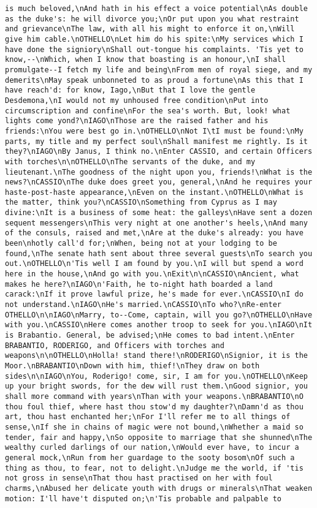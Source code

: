 \begin{verbatim}
is much beloved,\nAnd hath in his effect a voice potential\nAs double as the duke's: he will divorce you;\nOr put upon you what restraint and grievance\nThe law, with all his might to enforce it on,\nWill give him cable.\nOTHELLO\nLet him do his spite:\nMy services which I have done the signiory\nShall out-tongue his complaints. 'Tis yet to know,--\nWhich, when I know that boasting is an honour,\nI shall promulgate--I fetch my life and being\nFrom men of royal siege, and my demerits\nMay speak unbonneted to as proud a fortune\nAs this that I have reach'd: for know, Iago,\nBut that I love the gentle Desdemona,\nI would not my unhoused free condition\nPut into circumscription and confine\nFor the sea's worth. But, look! what lights come yond?\nIAGO\nThose are the raised father and his friends:\nYou were best go in.\nOTHELLO\nNot I\tI must be found:\nMy parts, my title and my perfect soul\nShall manifest me rightly. Is it they?\nIAGO\nBy Janus, I think no.\nEnter CASSIO, and certain Officers with torches\n\nOTHELLO\nThe servants of the duke, and my lieutenant.\nThe goodness of the night upon you, friends!\nWhat is the news?\nCASSIO\nThe duke does greet you, general,\nAnd he requires your haste-post-haste appearance,\nEven on the instant.\nOTHELLO\nWhat is the matter, think you?\nCASSIO\nSomething from Cyprus as I may divine:\nIt is a business of some heat: the galleys\nHave sent a dozen sequent messengers\nThis very night at one another's heels,\nAnd many of the consuls, raised and met,\nAre at the duke's already: you have been\nhotly call'd for;\nWhen, being not at your lodging to be found,\nThe senate hath sent about three several guests\nTo search you out.\nOTHELLO\n'Tis well I am found by you.\nI will but spend a word here in the house,\nAnd go with you.\nExit\n\nCASSIO\nAncient, what makes he here?\nIAGO\n'Faith, he to-night hath boarded a land carack:\nIf it prove lawful prize, he's made for ever.\nCASSIO\nI do not understand.\nIAGO\nHe's married.\nCASSIO\nTo who?\nRe-enter OTHELLO\n\nIAGO\nMarry, to--Come, captain, will you go?\nOTHELLO\nHave with you.\nCASSIO\nHere comes another troop to seek for you.\nIAGO\nIt is Brabantio. General, be advised;\nHe comes to bad intent.\nEnter BRABANTIO, RODERIGO, and Officers with torches and weapons\n\nOTHELLO\nHolla! stand there!\nRODERIGO\nSignior, it is the Moor.\nBRABANTIO\nDown with him, thief!\nThey draw on both sides\n\nIAGO\nYou, Roderigo! come, sir, I am for you.\nOTHELLO\nKeep up your bright swords, for the dew will rust them.\nGood signior, you shall more command with years\nThan with your weapons.\nBRABANTIO\nO thou foul thief, where hast thou stow'd my daughter?\nDamn'd as thou art, thou hast enchanted her;\nFor I'll refer me to all things of sense,\nIf she in chains of magic were not bound,\nWhether a maid so tender, fair and happy,\nSo opposite to marriage that she shunned\nThe wealthy curled darlings of our nation,\nWould ever have, to incur a general mock,\nRun from her guardage to the sooty bosom\nOf such a thing as thou, to fear, not to delight.\nJudge me the world, if 'tis not gross in sense\nThat thou hast practised on her with foul charms,\nAbused her delicate youth with drugs or minerals\nThat weaken motion: I'll have't disputed on;\n'Tis probable and palpable to 
\end{verbatim}
